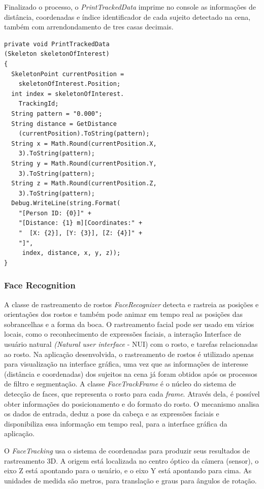 Finalizado o processo, o \textit{PrintTrackedData} imprime no console as informações de distância, coordenadas e índice identificador de cada sujeito detectado na cena, também com arrendondamento de tres casas decimais.
\begin{verbatim}
private void PrintTrackedData
(Skeleton skeletonOfInterest)
{
  SkeletonPoint currentPosition = 
    skeletonOfInterest.Position;
  int index = skeletonOfInterest.
    TrackingId;
  String pattern = "0.000";
  String distance = GetDistance
    (currentPosition).ToString(pattern);
  String x = Math.Round(currentPosition.X,
    3).ToString(pattern);
  String y = Math.Round(currentPosition.Y,
    3).ToString(pattern);
  String z = Math.Round(currentPosition.Z,
    3).ToString(pattern);
  Debug.WriteLine(string.Format(
    "[Person ID: {0}]" +
    "[Distance: {1} m][Coordinates:" + 
    "  [X: {2}], [Y: {3}], [Z: {4}]" + 
    "]",
     index, distance, x, y, z));
}
\end{verbatim}

\subsubsection{Face Recognition}\label{sec:depthDataRecognition}

A classe de rastreamento de rostos \textit{FaceRecognizer} detecta e rastreia as posições e orientações dos rostos e também pode animar em tempo real as posições das sobrancelhas e a forma da boca. O rastreamento facial pode ser usado em vários locais, como o reconhecimento de expressões faciais, a interação Interface de usuário natural \textit{(Natural user interface} - NUI) com o rosto, e tarefas relacionadas ao rosto. Na aplicação desenvolvida, o rastreamento de rostos é utilizado apenas para visualização na interface gráfica, uma vez que as informações de interesse (distância e coordenadas) dos sujeitos na cena já foram obtidos após os processos de filtro e segmentação. A classe \textit{FaceTrackFrame} é o núcleo do sistema de detecção de faces, que representa o rosto para cada \textit{frame}. Através dela, é possível obter informações do posicionamento e do formato do rosto. O mecanismo analisa os dados de entrada, deduz a pose da cabeça e as expressões faciais e disponibiliza essa informação em tempo real, para a interface gráfica da aplicação.

O \textit{FaceTracking} usa o sistema de coordenadas para produzir seus resultados de rastreamento 3D. A origem está localizada no centro óptico da câmera (sensor), o eixo Z está apontando para o usuário, e o eixo Y está apontando para cima. As unidades de medida são metros, para translação e graus para ângulos de rotação.


